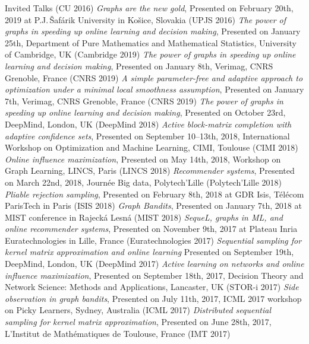 \documentclass{resume}
\begin{document}
\begin{category}{Invited Talks}
({\sf CU 2016})
\citembullet
\emph{Graphs are the new gold}, Presented on February 20th, 2019 at P.J.\,\v{S}af\'arik University in Ko\v{s}ice, Slovakia
({\sf UPJS 2016})
\citembullet
\emph{The power of graphs in speeding up online learning and decision making},
Presented on January 25th, Department of Pure Mathematics and Mathematical Statistics, University of Cambridge, UK
({\sf Cambridge  2019})
\citembullet
\emph{The power of graphs in speeding up online learning and decision making},
Presented on January 8th, Verimag, CNRS Grenoble, France
({\sf CNRS  2019})
\citembullet
\emph{A simple parameter-free and adaptive approach to optimization under a minimal local smoothness assumption},
Presented on January 7th, Verimag, CNRS Grenoble, France
({\sf CNRS  2019})
\citembullet
\emph{The power of graphs in speeding up online learning and decision making},
Presented on October 23rd, DeepMind, London, UK
({\sf DeepMind  2018})
\citembullet
\emph{Active block-matrix completion with adaptive confidence sets},  Presented on September 10--13th, 2018,  International Workshop  on Optimization and Machine Learning, CIMI, Toulouse ({\sf CIMI 2018})
\citembullet
\emph{Online influence maximization},  Presented on May 14th, 2018, Workshop on Graph Learning, LINCS, Paris ({\sf LINCS 2018})
\citembullet
\emph{Recommender systems},  Presented on March 22nd, 2018, Journ\' ee Big data, Polytech'Lille ({\sf Polytech'Lille 2018})
\citembullet
\emph{Pliable rejection sampling}, Presented on February 8th, 2018 at GDR Isis, T\' el\' ecom ParisTech in Paris ({\sf ISIS 2018})
\citembullet
\emph{Graph Bandits}, Presented on January 7th, 2018 at MIST conference in Rajeck\' a Lesn\' a ({\sf MIST 2018})
\citembullet
\emph{SequeL, graphs in ML, and online recommender systems}, Presented on November 9th, 2017 at Plateau Inria Euratechnologies in Lille, France  
({\sf Euratechnologies 2017})
\citembullet
\emph{Sequential sampling for kernel matrix approximation and online learning}
Presented on September 19th, DeepMind, London, UK
({\sf DeepMind  2017})
\citembullet
\emph{Active learning on networks and online influence maximization}, Presented on  September 18th, 2017, Decision Theory and Network Science: Methods and Applications, Lancaster, UK 
({\sf STOR-i  2017})
\citembullet
\emph{Side observation in graph bandits}, Presented on July 11th, 2017, ICML 2017 workshop on Picky Learners, Sydney, Australia ({\sf ICML 2017})
\citembullet
\emph{Distributed sequential sampling for kernel matrix approximation}, Presented on June 28th, 2017, L'Institut de Math\' ematiques de Toulouse, France
({\sf IMT 2017})

\end{category}
\end{document}

